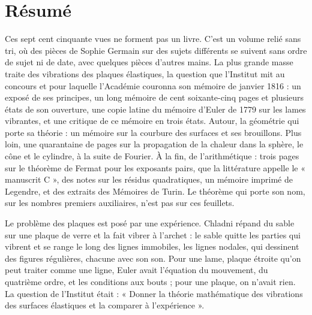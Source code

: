\documentclass[11pt,a4paper]{article}
\begin{document}
\section*{Résumé}

\begin{resume}
Ces sept cent cinquante vues ne forment pas un livre. C'est un volume relié sans
tri, où des pièces de Sophie Germain sur des sujets différents se suivent sans
ordre de sujet ni de date, avec quelques pièces d'autres mains. La plus grande
masse traite des vibrations des plaques élastiques, la question que l'Institut
mit au concours et pour laquelle l'Académie couronna son mémoire de janvier 1816 : un
exposé de ses principes, un long mémoire de cent soixante-cinq pages et plusieurs
états de son ouverture, une copie latine du mémoire d'Euler de 1779 sur les lames
vibrantes, et une critique de ce mémoire en trois états. Autour, la géométrie qui
porte sa théorie : un mémoire sur la courbure des surfaces et ses brouillons. Plus
loin, une quarantaine de pages sur la propagation de la chaleur dans la sphère, le
cône et le cylindre, à la suite de Fourier. À la fin, de l'arithmétique : trois
pages sur le théorème de Fermat pour les exposants pairs, que la littérature
appelle le « manuscrit C », des notes sur les résidus quadratiques, un mémoire
imprimé de Legendre, et des extraits des Mémoires de Turin. Le théorème qui porte
son nom, sur les nombres premiers auxiliaires, n'est pas sur ces feuillets.

Le problème des plaques est posé par une expérience. Chladni répand du sable sur
une plaque de verre et la fait vibrer à l'archet : le sable quitte les parties qui
vibrent et se range le long des lignes immobiles, les lignes nodales, qui
dessinent des figures régulières, chacune avec son son. Pour une lame, plaque
étroite qu'on peut traiter comme une ligne, Euler avait l'équation du mouvement,
du quatrième ordre, et les conditions aux bouts ; pour une plaque, on n'avait
rien. La question de l'Institut était : « Donner la théorie mathématique des
vibrations des surfaces élastiques et la comparer à l'expérience ».


\end{resume}
\end{document}
